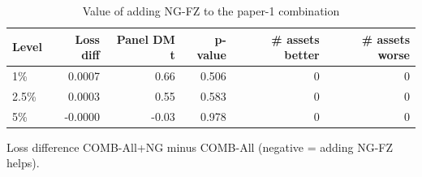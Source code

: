 \begin{table}[htbp]
\centering
\footnotesize
\caption{Value of adding NG-FZ to the paper-1 combination}
\label{tab:combo_ng}
\begin{tabular}{lrrrrr}
\toprule
Level & Loss diff & Panel DM t & p-value & \# assets better & \# assets worse \\
\midrule
1\% & 0.0007 & 0.66 & 0.506 & 0 & 0 \\
2.5\% & 0.0003 & 0.55 & 0.583 & 0 & 0 \\
5\% & -0.0000 & -0.03 & 0.978 & 0 & 0 \\
\bottomrule
\end{tabular}
\par\smallskip\parbox{\linewidth}{\scriptsize Loss difference COMB-All+NG minus COMB-All (negative = adding NG-FZ helps).}
\end{table}